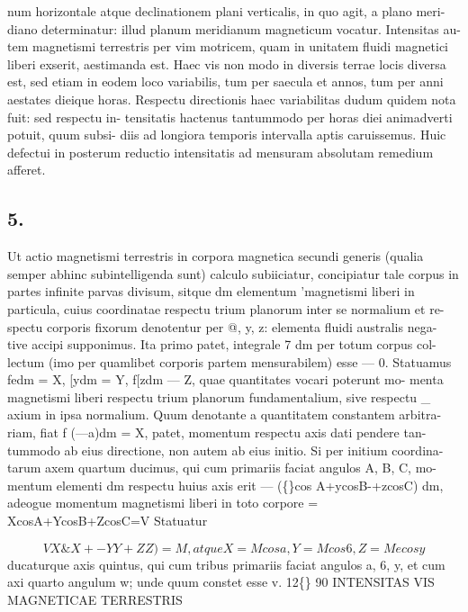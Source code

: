 \documentclass[12pt,a4paper]{article}
\begin{document}
num horizontale atque declinationem plani verticalis, in quo agit, a plano meri-
diano determinatur: illud planum meridianum magneticum vocatur.               Intensitas au-
tem magnetismi terrestris per vim motricem, quam in unitatem fluidi magnetici
liberi exserit,   aestimanda est.
Haec vis non modo in diversis terrae locis diversa est, sed etiam in eodem
loco variabilis, tum per saecula et annos,       tum per anni aestates dieique horas.
Respectu directionis haec variabilitas dudum quidem nota fuit: sed respectu in-
tensitatis hactenus tantummodo per horas diei animadverti potuit, quum subsi-
diis ad longiora temporis intervalla aptis caruissemus. Huic defectui in posterum
reductio intensitatis ad mensuram absolutam remedium afferet.


\subsection*{5.}

Ut actio magnetismi terrestris in corpora magnetica secundi generis (qualia
semper abhinc subintelligenda sunt) calculo subiiciatur, concipiatur tale corpus
in partes infinite parvas divisum, sitque dm            elementum 'magnetismi liberi in
particula, cuius coordinatae respectu trium planorum inter se normalium et re-
spectu corporis fixorum denotentur per       @, y, z:    elementa fluidi australis nega-
tive accipi supponimus.      Ita primo patet, integrale      7 dm   per totum corpus col-
lectum (imo per quamlibet corporis partem mensurabilem) esse --- 0. Statuamus
fedm = X, [ydm = Y, f[zdm --- Z, quae quantitates vocari poterunt mo-
menta magnetismi liberi respectu trium planorum fundamentalium, sive respectu
\_ axium in ipsa normalium.   Quum denotante a quantitatem constantem arbitra-
riam, fiat f (---a)dm = X,            patet, momentum respectu axis dati pendere tan-
tummodo ab eius directione, non autem ab eius initio. Si per initium coordina-
tarum axem quartum ducimus, qui cum primariis faciat angulos A, B, C, mo-
mentum elementi dm respectu huius axis erit --- (\guillemotleft\{\}cos A+ycosB-+zcosC) dm,
adeogue momentum magnetismi liberi in toto corpore
= XcosA+YcosB+ZcosC=V
Statuatur

\[ VX\&X+-YY+ZZ)=M,                atque X=Mcosa,               Y=Mcos6,          Z = Mecosy\]
ducaturque axis quintus, qui cum tribus primariis faciat angulos a, 6, y, et cum
axi quarto angulum     w; unde quum constet esse
v.                                                                    12\textdegree\{\}
90                           INTENSITAS    VIS MAGNETICAE   TERRESTRIS
\end{document}
